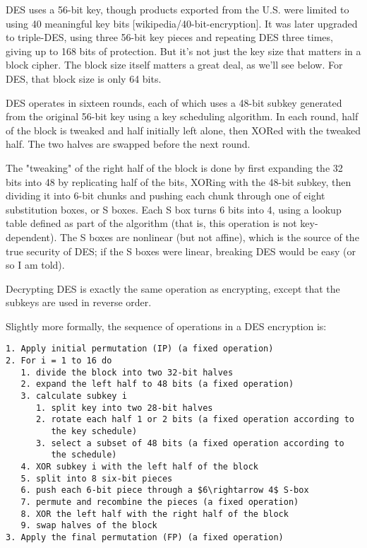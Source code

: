 \documentclass[%
 aip,
 jmp,%
 amsmath,amssymb,
 reprint,%
]{revtex4-1}
\begin{document}
DES uses a 56-bit key, though products exported from the U.S. were
limited to using 40 meaningful key bits [wikipedia/40-bit-encryption].
It was later upgraded to triple-DES, using three 56-bit key pieces and
repeating DES three times, giving up to 168 bits of protection.  But
it's not just the key size that matters in a block cipher.  The block
size itself matters a great deal, as we'll see below.  For DES, that
block size is only 64 bits.

DES operates in sixteen rounds, each of which uses a 48-bit subkey
generated from the original 56-bit key using a key scheduling
algorithm.  In each round, half of the block is tweaked and half
initially left alone, then XORed with the tweaked half.  The two
halves are swapped before the next round.

The "tweaking" of the right half of the block is done by first
expanding the 32 bits into 48 by replicating half of the bits, XORing
with the 48-bit subkey, then dividing it into 6-bit chunks and pushing
each chunk through one of eight substitution boxes, or S boxes.  Each
S box turns 6 bits into 4, using a lookup table defined as part of the
algorithm (that is, this operation is not key-dependent).  The S boxes
are nonlinear (but not affine), which is the source of the true
security of DES; if the S boxes were linear, breaking DES would be
easy (or so I am told).

Decrypting DES is exactly the same operation as encrypting, except
that the subkeys are used in reverse order.

Slightly more formally, the sequence of operations in a DES encryption
is:

\begin{verbatim}
1. Apply initial permutation (IP) (a fixed operation)
2. For i = 1 to 16 do
   1. divide the block into two 32-bit halves
   2. expand the left half to 48 bits (a fixed operation)
   3. calculate subkey i
      1. split key into two 28-bit halves
      2. rotate each half 1 or 2 bits (a fixed operation according to
         the key schedule)
      3. select a subset of 48 bits (a fixed operation according to
         the schedule)
   4. XOR subkey i with the left half of the block
   5. split into 8 six-bit pieces
   6. push each 6-bit piece through a $6\rightarrow 4$ S-box
   7. permute and recombine the pieces (a fixed operation)
   8. XOR the left half with the right half of the block
   9. swap halves of the block
3. Apply the final permutation (FP) (a fixed operation)
\end{verbatim}
\end{document}
